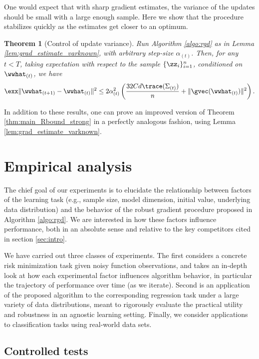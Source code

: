 \documentclass[11pt,oneside]{article}
\theoremstyle{definition} \newtheorem{defn}{Definition}       %
\theoremstyle{plain} \newtheorem{prop}[defn]{Proposition}           %
\theoremstyle{plain} \newtheorem{thm}[defn]{Theorem}                %
\theoremstyle{plain} \newtheorem{lem}[defn]{Lemma}                  %
\theoremstyle{plain} \newtheorem{cor}[defn]{Corollary}              %
\theoremstyle{remark} \newtheorem{rmk}[defn]{Remark}                %
\theoremstyle{remark} \newtheorem{ex}[defn]{Example}                %
\begin{document}
\noindent One would expect that with sharp gradient estimates, the variance of the updates should be small with a large enough sample. Here we show that the procedure stabilizes quickly as the estimates get closer to an optimum.
%
\begin{thm}[Control of update variance]\label{thm:variance_control}
Run Algorithm \ref{algo:rgd} as in Lemma \ref{lem:grad_estimate_varknown}, with arbitrary step-size $\alpha_{(t)}$. Then, for any $t<T$, taking expectation with respect to the sample $\{\zz_{i}\}_{i=1}^{n}$, conditioned on $\wwhat_{(t)}$, we have
%
\begin{align*}
\exx\|\wwhat_{(t+1)}-\wwhat_{(t)}\|^{2} \leq 2\alpha_{(t)}^{2}\left(\frac{32Cd\trace(\Sigma_{(t)})}{n} + \|\gvec(\wwhat_{(t)})\|^{2}\right).
\end{align*}
\end{thm}

\noindent In addition to these results, one can prove an improved version of Theorem \ref{thm:main_Rbound_strong} in a perfectly analogous fashion, using Lemma \ref{lem:grad_estimate_varknown}.



\section{Empirical analysis}\label{sec:tests}

The chief goal of our experiments is to elucidate the relationship between factors of the learning task (e.g., sample size, model dimension, initial value, underlying data distribution) and the behavior of the robust gradient procedure proposed in Algorithm \ref{algo:rgd}. We are interested in how these factors influence performance, both in an absolute sense and relative to the key competitors cited in section \ref{sec:intro}.

We have carried out three classes of experiments. The first considers a concrete risk minimization task given noisy function observations, and takes an in-depth look at how each experimental factor influences algorithm behavior, in particular the trajectory of performance over time (as we iterate). Second is an application of the proposed algorithm to the corresponding regression task under a large variety of data distributions, meant to rigorously evaluate the practical utility and robustness in an agnostic learning setting. Finally, we consider applications to classification tasks using real-world data sets.


\subsection{Controlled tests}\label{sec:tests_noisyopt}
\end{document}
